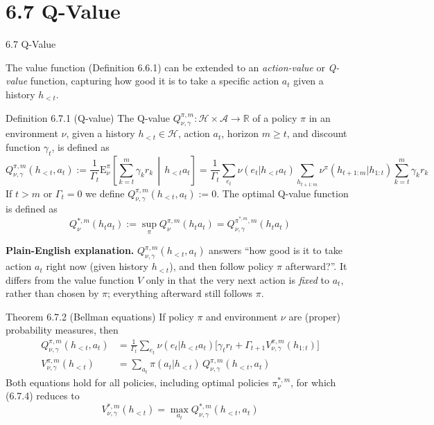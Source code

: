 \documentclass[aspectratio=169,10pt]{beamer}
\newcommand{\A}{\mathcal{A}}
\newcommand{\Hcal}{\mathcal{H}}
\begin{document}
\section{6.7 Q-Value}

\begin{frame}[allowframebreaks]{6.7 Q-Value}

The value function (Definition 6.6.1) can be extended to an
\emph{action-value} or \emph{Q-value} function, capturing how good it is to
take a specific action $a_t$ given a history $h_{<t}$.

\begin{block}{Definition 6.7.1 (Q-value)}
The Q-value $Q^{\pi,m}_{\nu,\gamma}: \Hcal \times \A \to \mathbb{R}$ of a
policy $\pi$ in an environment $\nu$, given a history $h_{<t}\in\Hcal$,
action $a_t$, horizon $m\ge t$, and discount function $\gamma_t$, is
defined as
\[
  Q^{\pi,m}_{\nu,\gamma}(h_{<t},a_t) :=
  \frac{1}{\Gamma_t}\mathrm{E}^\pi_\nu\!\left[\sum_{k=t}^{m}\gamma_k r_k\,\middle|\,h_{<t}a_t\right]
  = \frac{1}{\Gamma_t}\sum_{e_t}\nu(e_t|h_{<t}a_t)\sum_{h_{t+1:m}}\nu^\pi(h_{t+1:m}|h_{1:t})\sum_{k=t}^m\gamma_k r_k
\]
If $t>m$ or $\Gamma_t=0$ we define $Q^{\pi,m}_{\nu,\gamma}(h_{<t},a_t):=0$.
The optimal Q-value function is defined as
\[
  Q^{*,m}_\nu(h_t a_t) := \sup_\pi Q^{\pi,m}_\nu(h_ta_t) = Q^{\pi^{*,m},m}_{\nu,\gamma}(h_ta_t)
\]
\end{block}

\textbf{Plain-English explanation.} $Q^{\pi,m}_{\nu,\gamma}(h_{<t},a_t)$
answers ``how good is it to take action $a_t$ right now (given history
$h_{<t}$), and then follow policy $\pi$ afterward?''. It differs from the
value function $V$ only in that the very next action is \emph{fixed} to
$a_t$, rather than chosen by $\pi$; everything afterward still follows
$\pi$.

\framebreak

\begin{block}{Theorem 6.7.2 (Bellman equations)}
If policy $\pi$ and environment $\nu$ are (proper) probability measures,
then
\begin{align}
  Q^{\pi,m}_{\nu,\gamma}(h_{<t},a_t) &= \frac{1}{\Gamma_t}\sum_{e_t}\nu(e_t|h_{<t}a_t)
  \big[\gamma_t r_t + \Gamma_{t+1}V^{\pi,m}_{\nu,\gamma}(h_{1:t})\big] \tag{6.7.3}\\
  V^{\pi,m}_{\nu,\gamma}(h_{<t}) &= \sum_{a_t}\pi(a_t|h_{<t})\,Q^{\pi,m}_{\nu,\gamma}(h_{<t},a_t) \tag{6.7.4}
\end{align}
Both equations hold for all policies, including optimal policies
$\pi^{*,m}_\nu$, for which (6.7.4) reduces to
\[
  V^{*,m}_{\nu,\gamma}(h_{<t}) = \max_{a_t} Q^{*,m}_{\nu,\gamma}(h_{<t},a_t) \tag{6.7.5}
\]
\end{block}


\end{frame}
\end{document}
